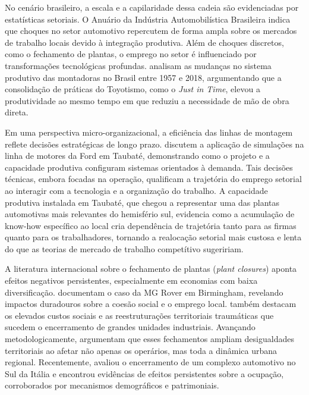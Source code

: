 \documentclass[12pt,a4paper]{article}
\begin{document}
No cen\'ario brasileiro, a escala e a capilaridade dessa cadeia s\~ao evidenciadas por estat\'isticas setoriais. O Anu\'ario da Ind\'ustria Automobilística Brasileira \parencite{anfavea2021} indica que choques no setor automotivo repercutem de forma ampla sobre os mercados de trabalho locais devido \`a integra\c{c}\~ao produtiva. Al\'em de choques discretos, como o fechamento de plantas, o emprego no setor \'e influenciado por transforma\c{c}\~oes tecnol\'ogicas profundas. \textcite{vargas2021} analisam as mudan\c{c}as no sistema produtivo das montadoras no Brasil entre 1957 e 2018, argumentando que a consolida\c{c}\~ao de pr\'aticas do Toyotismo, como o \textit{Just in Time}, elevou a produtividade ao mesmo tempo em que reduziu a necessidade de m\~ao de obra direta.

Em uma perspectiva micro-organizacional, a efici\^encia das linhas de montagem reflete decis\~oes estrat\'egicas de longo prazo. \textcite{santoro2000} discutem a aplica\c{c}\~ao de simula\c{c}\~oes na linha de motores da Ford em Taubat\'e, demonstrando como o projeto e a capacidade produtiva configuram sistemas orientados \`a demanda. Tais decis\~oes t\'ecnicas, embora focadas na opera\c{c}\~ao, qualificam a trajet\'oria do emprego setorial ao interagir com a tecnologia e a organiza\c{c}\~ao do trabalho. A capacidade produtiva instalada em Taubat\'e, que chegou a representar uma das plantas automotivas mais relevantes do hemisf\'erio sul, evidencia como a acumula\c{c}\~ao de know-how espec\'ifico ao local cria depend\^encia de trajet\'oria tanto para as firmas quanto para os trabalhadores, tornando a realoca\c{c}\~ao setorial mais custosa e lenta do que as teorias de mercado de trabalho compet\'itivo sugeririam.

A literatura internacional sobre o fechamento de plantas (\textit{plant closures}) aponta efeitos negativos persistentes, especialmente em economias com baixa diversifica\c{c}\~ao. \textcite{chapain2008} documentam o caso da MG Rover em Birmingham, revelando impactos duradouros sobre a coes\~ao social e o emprego local. \textcite{perrucci1988} tamb\'em destacam os elevados custos sociais e as reestrutura\c{c}\~oes territoriais traum\'aticas que sucedem o encerramento de grandes unidades industriais. Avan\c{c}ando metodologicamente, \textcite{beer2019} argumentam que esses fechamentos ampliam desigualdades territoriais ao afetar n\~ao apenas os oper\'arios, mas toda a din\^amica urbana regional. Recentemente, \textcite{david2025} avaliou o encerramento de um complexo automotivo no Sul da It\'alia e encontrou evid\^encias de efeitos persistentes sobre a ocupa\c{c}\~ao, corroborados por mecanismos demogr\'aficos e patrimoniais.
\end{document}
